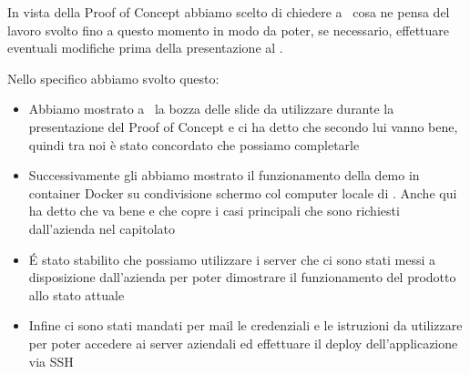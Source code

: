     	In vista della Proof of Concept abbiamo scelto di chiedere a \DZ~cosa ne pensa del lavoro svolto fino a questo momento in modo da poter, se necessario, effettuare eventuali modifiche prima della presentazione al \RC.
        
        Nello specifico abbiamo svolto questo:
        \begin{itemize}
            \item Abbiamo mostrato a \DZ~la bozza delle slide da utilizzare durante la presentazione del Proof of Concept e ci ha detto che secondo lui vanno bene, quindi tra noi è stato concordato che possiamo completarle
            \item Successivamente gli abbiamo mostrato il funzionamento della demo in container Docker su condivisione schermo col computer locale di \CV.
            Anche qui ha detto che va bene e che copre i casi principali che sono richiesti dall'azienda nel capitolato
            \item \'E stato stabilito che possiamo utilizzare i server che ci sono stati messi a disposizione dall'azienda per poter dimostrare il funzionamento del prodotto allo stato attuale
            \item Infine ci sono stati mandati per mail le credenziali e le istruzioni da utilizzare per poter accedere ai server aziendali ed effettuare il deploy dell'applicazione via SSH
        \end{itemize}
    	
